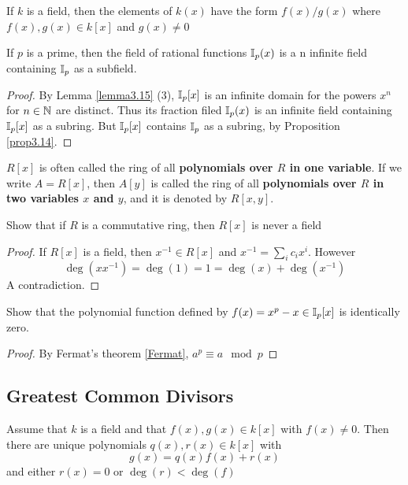 \documentclass[11pt]{article}
\begin{document}
\begin{proposition}[]
If \(k\) is a field, then the elements of \(k(x)\) have the form \(f(x)/g(x)\)
where \(f(x),g(x)\in k[x]\) and \(g(x)\neq 0\)
\end{proposition}

\begin{proposition}[]
If \(p\) is a prime, then the field of rational functions \(\mathbb{I}_p(x)\) is a n
infinite field containing \(\mathbb{I}_p\) as a subfield.
\end{proposition}

\begin{proof}
By Lemma \ref{lemma3.15} (3), \(\mathbb{I}_p[x]\) is an infinite domain for the powers
\(x^n\) for \(n\in\mathbb{N}\) are distinct. Thus its fraction filed \(\mathbb{I}_p(x)\) is an
infinite field containing \(\mathbb{I}_p[x]\) as a subring. But \(\mathbb{I}_p[x]\) contains
\(\mathbb{I}_p\) as a subring, by Proposition \ref{prop3.14}.
\end{proof}


\(R[x]\) is often called the ring of all \textbf{polynomials over \(R\) in one variable}.
If we write \(A=R[x]\), then \(A[y]\) is called the ring of all 
\textbf{polynomials over \(R\) in two variables \(x\) and \(y\)}, and it is denoted by \(R[x,y]\).

\begin{exercise}
Show that if \(R\) is a commutative ring, then \(R[x]\) is never a field
\end{exercise}

\begin{proof}
If \(R[x]\) is a field, then \(x^{-1}\in R[x]\) and \(x^{-1}=\sum_ic_ix^i\).
However
\begin{equation*}
\deg(xx^{-1})=\deg(1)=1=\deg(x)+\deg(x^{-1})
\end{equation*}
A contradiction.
\end{proof}

\begin{exercise}
\label{ex3.22}
Show that the polynomial function defined by \(f(x)=x^p-x\in\mathbb{I}_p[x]\) is
identically zero.
\end{exercise}

\begin{proof}
By Fermat's theorem \ref{Fermat}, \(a^p\equiv a\mod p\)
\end{proof}
\subsection{Greatest Common Divisors}
\label{sec:org15ccb52}
\begin{theorem}
Assume that \(k\) is a field and that \(f(x),g(x)\in k[x]\) with \(f(x)\neq 0\).
Then there are unique polynomials \(q(x),r(x)\in k[x]\) with
\begin{equation*}
g(x)=q(x)f(x)+r(x)
\end{equation*}
and either \(r(x)=0\) or \(\deg(r)<\deg(f)\)
\end{theorem}
\end{document}
